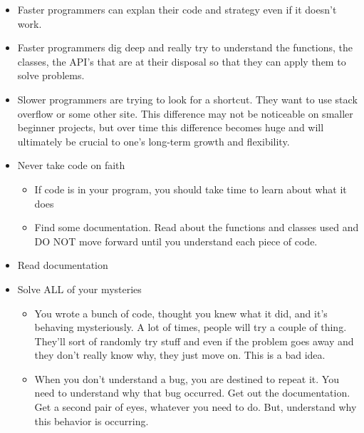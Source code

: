\begin{itemize}
	\item
	Faster programmers can explan their code and strategy even if it  doesn't work.
	\item
	Faster programmers dig deep and really try to understand the functions, the classes, the API's that are at their disposal so that they can apply them to solve problems.
	\item
	Slower programmers are trying to look for a shortcut. They want to use stack overflow or some other site. This difference may not be noticeable on smaller beginner projects, but over time this difference becomes huge and will ultimately be crucial to one's long-term growth and flexibility.
	\item
	Never take code on faith

	\begin{itemize}
		\item
		If code is in your program, you should take time to learn about what it does
		\item
		Find some documentation. Read about the functions and classes used and DO NOT move forward until you understand each piece of code.
	\end{itemize}
	\item
	Read documentation
	\item
	Solve ALL of your mysteries
	\begin{itemize}
		\item
		You wrote a bunch of code, thought you knew what it did, and it's behaving mysteriously. A lot of times, people will try a couple of thing. They'll sort of randomly try stuff and even if the problem goes away and they don't really know why, they just move on. This is a bad idea.
		\item
		When you don't understand a bug, you are destined to repeat it. You need to understand why that bug occurred. Get out the documentation. Get a second pair of eyes, whatever you need to do. But, understand why this behavior is occurring.
	\end{itemize}
\end{itemize}
